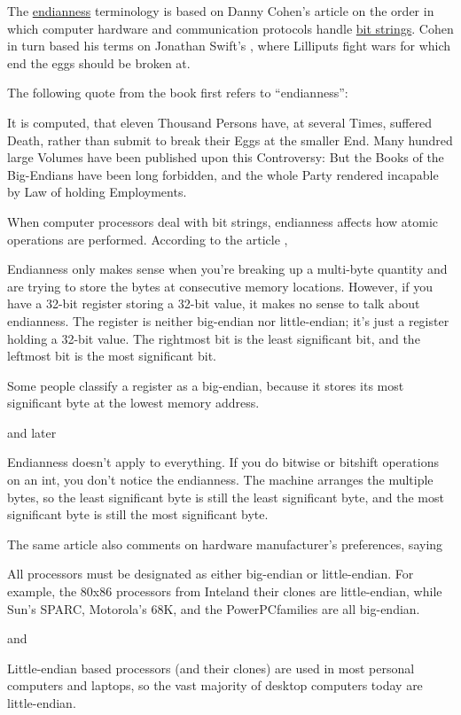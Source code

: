 \begin{remark}\label{rem:endianness}
  The \hyperref[def:endianness]{endianness} terminology is based on Danny Cohen's article \cite{Cohen1981Endianness} on the order in which computer hardware and communication protocols handle \hyperref[def:bit_string]{bit strings}. Cohen in turn based his terms on Jonathan Swift's \cite{Swift2005GulliverTravels}, where Lilliputs fight wars for which end the eggs should be broken at.

  The following quote from the book first refers to \enquote{endianness}:
  \begin{displayquote}
    It is computed, that eleven Thousand Persons have, at several Times, suffered Death, rather than submit to break their Eggs at the smaller End. Many hundred large Volumes have been published upon this Controversy: But the Books of the Big-Endians have been long forbidden, and the whole Party rendered incapable by Law of holding Employments.
  \end{displayquote}

  When computer processors deal with bit strings, endianness affects how atomic operations are performed. According to the article \cite{IBMDocs:endian_independent_code},
  \begin{displayquote}
    Endianness only makes sense when you're breaking up a multi-byte quantity and are trying to store the bytes at consecutive memory locations. However, if you have a 32-bit register storing a 32-bit value, it makes no sense to talk about endianness. The register is neither big-endian nor little-endian; it's just a register holding a 32-bit value. The rightmost bit is the least significant bit, and the leftmost bit is the most significant bit.

    Some people classify a register as a big-endian, because it stores its most significant byte at the lowest memory address.
  \end{displayquote}
  and later
  \begin{displayquote}
    Endianness doesn't apply to everything. If you do bitwise or bitshift operations on an int, you don't notice the endianness. The machine arranges the multiple bytes, so the least significant byte is still the least significant byte, and the most significant byte is still the most significant byte.
  \end{displayquote}

  The same article also comments on hardware manufacturer's preferences, saying
  \begin{displayquote}
    All processors must be designated as either big-endian or little-endian. For example, the 80x86 processors from Intel\textregistered and their clones are little-endian, while Sun's SPARC, Motorola's 68K, and the PowerPC\textregistered families are all big-endian.
  \end{displayquote}
  and
  \begin{displayquote}
    Little-endian based processors (and their clones) are used in most personal computers and laptops, so the vast majority of desktop computers today are little-endian.
  \end{displayquote}


\end{remark}
